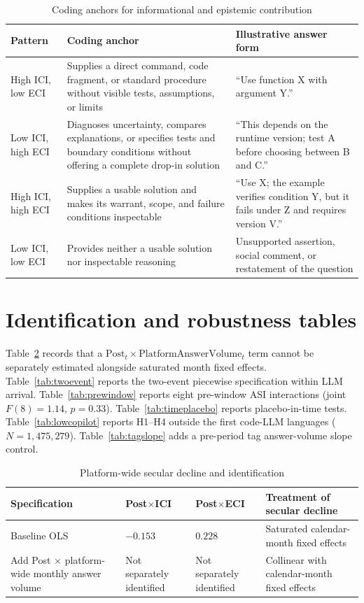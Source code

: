 \begin{table}[t]
\centering
\caption{Coding anchors for informational and epistemic contribution}
\label{tab:codinganchors}
\scriptsize
\begin{tabular}{p{}p{}p{}}
\toprule
Pattern & Coding anchor & Illustrative answer form \\
\midrule
High ICI, low ECI & Supplies a direct command, code fragment, or standard
procedure without visible tests, assumptions, or limits & ``Use function
X with argument Y.'' \\
Low ICI, high ECI & Diagnoses uncertainty, compares explanations, or
specifies tests and boundary conditions without offering a complete
drop-in solution & ``This depends on the runtime version; test A before
choosing between B and C.'' \\
High ICI, high ECI & Supplies a usable solution and makes its warrant,
scope, and failure conditions inspectable & ``Use X; the example verifies
condition Y, but it fails under Z and requires version V.'' \\
Low ICI, low ECI & Provides neither a usable solution nor inspectable
reasoning & Unsupported assertion, social comment, or restatement of the
question \\
\bottomrule
\end{tabular}
\end{table}

\section{Identification and robustness tables}
\label{app:identification}

Table~\ref{tab:secular_control} records that a $\mathrm{Post}_t\times\mathrm{PlatformAnswerVolume}_t$ term cannot be separately estimated alongside saturated month fixed effects. Table~\ref{tab:twoevent} reports the two-event piecewise specification within LLM arrival. Table~\ref{tab:prewindow} reports eight pre-window ASI interactions (joint $F(8)=1.14$, $p=0.33$). Table~\ref{tab:timeplacebo} reports placebo-in-time tests. Table~\ref{tab:lowcopilot} reports H1--H4 outside the first code-LLM languages ($N=1{,}475{,}279$). Table~\ref{tab:tagslope} adds a pre-period tag answer-volume slope control.

\begin{table}[t]
\centering
\caption{Platform-wide secular decline and identification}
\label{tab:secular_control}
\scriptsize
\setlength{\tabcolsep}{3pt}
\begin{tabular}{p{}p{}p{}p{}}
\toprule
Specification & Post$\times$ICI & Post$\times$ECI & Treatment of secular decline \\
\midrule
Baseline OLS & $-0.153$ & $0.228$ & Saturated calendar-month fixed effects \\
Add Post $\times$ platform-wide monthly answer volume & Not separately identified & Not separately identified & Collinear with calendar-month fixed effects \\
\bottomrule
\end{tabular}
\end{table}

